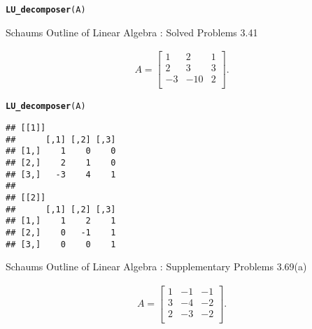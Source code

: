 \documentclass[11pt, a4paper]{article}\usepackage[]{graphicx}\usepackage[]{xcolor}
\makeatletter
\newcommand{\hldef}[1]{\textcolor[rgb]{0.345,0.345,0.345}{#1}}%
\newcommand{\hlkwd}[1]{\textcolor[rgb]{0.737,0.353,0.396}{\textbf{#1}}}%
\newenvironment{kframe}{%
 \def\at@end@of@kframe{}%
 \ifinner\ifhmode%
  \def\at@end@of@kframe{\end{minipage}}%
  \begin{minipage}{\columnwidth}%
 \fi\fi%
 \def\FrameCommand##1{\hskip\@totalleftmargin \hskip-\fboxsep
 \colorbox{shadecolor}{##1}\hskip-\fboxsep
     \hskip-\linewidth \hskip-\@totalleftmargin \hskip\columnwidth}%
 \MakeFramed {\advance\hsize-\width
   \@totalleftmargin\z@ \linewidth\hsize
   \@setminipage}}%
 {\par\unskip\endMakeFramed%
 \at@end@of@kframe}
\newenvironment{knitrout}{}{} %
\makeatother
\begin{document}
\begin{knitrout}
\color{fgcolor}\begin{kframe}
\begin{alltt}
\hlkwd{LU_decomposer}\hldef{(A)}
\end{alltt}


{\ttfamily\noindent\bfseries\color{errorcolor}{\#\# Error in LU\_decomposer(A): All the leading principal minors must be non-zero.}}\end{kframe}
\end{knitrout}

\leftpointright \hspace{0.2cm} Schaums Outline of Linear Algebra : Solved Problems 3.41

\begin{gather*}
A = 
\begin{bmatrix}
1 & 2 & 1 \\
2 & 3 & 3 \\
-3 & -10 & 2 \\
\end{bmatrix}.
\end{gather*}



\begin{knitrout}
\color{fgcolor}\begin{kframe}
\begin{alltt}
\hlkwd{LU_decomposer}\hldef{(A)}
\end{alltt}
\begin{verbatim}
## [[1]]
##      [,1] [,2] [,3]
## [1,]    1    0    0
## [2,]    2    1    0
## [3,]   -3    4    1
## 
## [[2]]
##      [,1] [,2] [,3]
## [1,]    1    2    1
## [2,]    0   -1    1
## [3,]    0    0    1
\end{verbatim}
\end{kframe}
\end{knitrout}


\leftpointright \hspace{0.2cm} Schaums Outline of Linear Algebra : Supplementary Problems 3.69(a)

\begin{gather*}
A = 
\begin{bmatrix}
1 & -1 & -1 \\
3 & -4 & -2 \\
2 & -3 & -2 \\
\end{bmatrix}.
\end{gather*}
\end{document}

